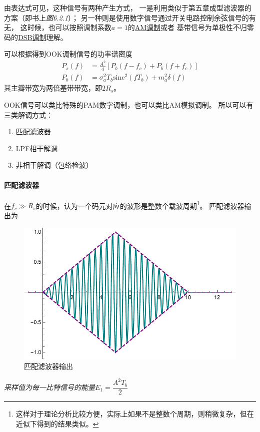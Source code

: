     由表达式可见，这种信号有两种产生方式，
    一是利用类似于第五章成型滤波器的方案（即书上\emph{图6.2.1}）；
    另一种则是使用数字信号通过开关电路控制余弦信号的有无，
    这时候，也可以按照调制系数$a=1$的\hyperref[subsubsec:AM]{AM调制}或者
    基带信号为单极性不归零码的\hyperref[subsubsec:DSB-SCAM]{DSB调制}理解。

    可以根据得到OOK调制信号的功率谱密度
    \begin{equation}
        \begin{split}
            P_s(f)&=\frac{A^2}{4}[P_b(f-f_c)+P_b(f+f_c)]\\
            P_b(f)&=\sigma_a^2T_b\text{sinc}^2(fT_b)+m_a^2\delta(f)
        \end{split}
    \end{equation}
    其主瓣带宽为两倍基带带宽，即$2R_s$。

    OOK信号可以类比特殊的PAM数字调制，也可以类比AM模拟调制。
    所以可以有三类解调方式：
    \vspace{-2ex}

    \begin{enumerate}[itemsep=0pt,parsep=0em,label=\color{bupt}\arabic*、,labelsep=0pt,leftmargin=4em]
        \item 匹配滤波器
        \item LPF相干解调
        \item 非相干解调（包络检波）
    \end{enumerate}

    \paragraph{匹配滤波器}\mbox{}

    在$f_c\gg R_s$的时候，认为一个码元对应的波形是整数个载波周期\footnote{这样对于理论分析比较方便，实际上如果不是整数个周期，则稍微复杂，但在近似下得到的结果类似。}。
    匹配滤波器输出为
    \begin{figure}[H]
        \centering
        \includegraphics[scale=0.8]{body/image/book626.pdf}
        \caption{匹配滤波器输出}
    \end{figure}
    \emph{采样值为每一比特信号的能量$E_1=\dfrac{A^2T_b}{2}$}

